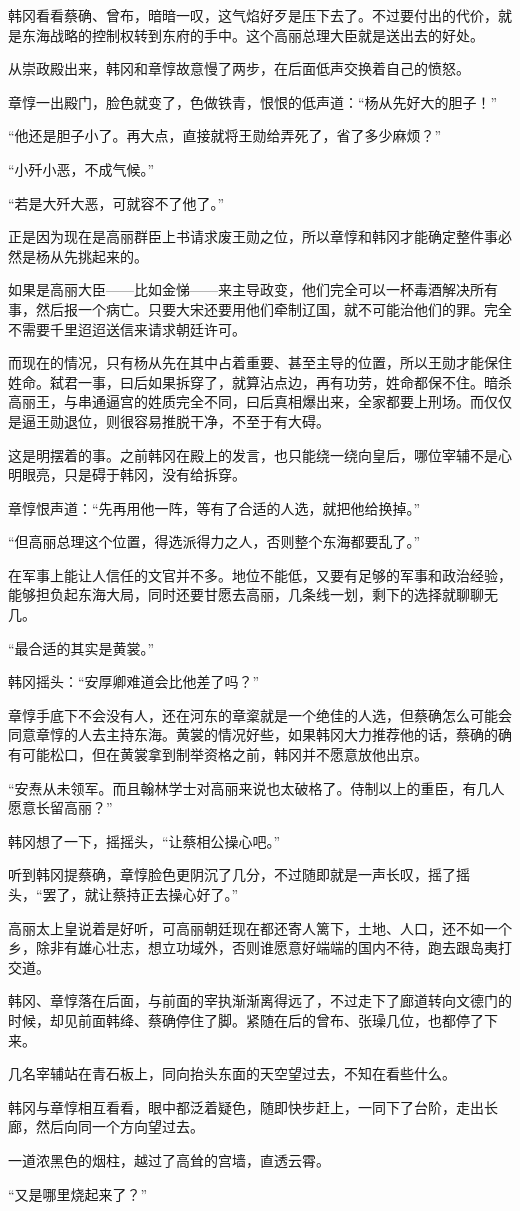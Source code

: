 韩冈看看蔡确、曾布，暗暗一叹，这气焰好歹是压下去了。不过要付出的代价，就是东海战略的控制权转到东府的手中。这个高丽总理大臣就是送出去的好处。

从崇政殿出来，韩冈和章惇故意慢了两步，在后面低声交换着自己的愤怒。

章惇一出殿门，脸色就变了，色做铁青，恨恨的低声道：“杨从先好大的胆子！”

“他还是胆子小了。再大点，直接就将王勋给弄死了，省了多少麻烦？”

“小歼小恶，不成气候。”

“若是大歼大恶，可就容不了他了。”

正是因为现在是高丽群臣上书请求废王勋之位，所以章惇和韩冈才能确定整件事必然是杨从先挑起来的。

如果是高丽大臣——比如金悌——来主导政变，他们完全可以一杯毒酒解决所有事，然后报一个病亡。只要大宋还要用他们牵制辽国，就不可能治他们的罪。完全不需要千里迢迢送信来请求朝廷许可。

而现在的情况，只有杨从先在其中占着重要、甚至主导的位置，所以王勋才能保住姓命。弑君一事，曰后如果拆穿了，就算沾点边，再有功劳，姓命都保不住。暗杀高丽王，与串通逼宫的姓质完全不同，曰后真相爆出来，全家都要上刑场。而仅仅是逼王勋退位，则很容易推脱干净，不至于有大碍。

这是明摆着的事。之前韩冈在殿上的发言，也只能绕一绕向皇后，哪位宰辅不是心明眼亮，只是碍于韩冈，没有给拆穿。

章惇恨声道：“先再用他一阵，等有了合适的人选，就把他给换掉。”

“但高丽总理这个位置，得选派得力之人，否则整个东海都要乱了。”

在军事上能让人信任的文官并不多。地位不能低，又要有足够的军事和政治经验，能够担负起东海大局，同时还要甘愿去高丽，几条线一划，剩下的选择就聊聊无几。

“最合适的其实是黄裳。”

韩冈摇头：“安厚卿难道会比他差了吗？”

章惇手底下不会没有人，还在河东的章楶就是一个绝佳的人选，但蔡确怎么可能会同意章惇的人去主持东海。黄裳的情况好些，如果韩冈大力推荐他的话，蔡确的确有可能松口，但在黄裳拿到制举资格之前，韩冈并不愿意放他出京。

“安焘从未领军。而且翰林学士对高丽来说也太破格了。侍制以上的重臣，有几人愿意长留高丽？”

韩冈想了一下，摇摇头，“让蔡相公操心吧。”

听到韩冈提蔡确，章惇脸色更阴沉了几分，不过随即就是一声长叹，摇了摇头，“罢了，就让蔡持正去操心好了。”

高丽太上皇说着是好听，可高丽朝廷现在都还寄人篱下，土地、人口，还不如一个乡，除非有雄心壮志，想立功域外，否则谁愿意好端端的国内不待，跑去跟岛夷打交道。

韩冈、章惇落在后面，与前面的宰执渐渐离得远了，不过走下了廊道转向文德门的时候，却见前面韩绛、蔡确停住了脚。紧随在后的曾布、张璪几位，也都停了下来。

几名宰辅站在青石板上，同向抬头东面的天空望过去，不知在看些什么。

韩冈与章惇相互看看，眼中都泛着疑色，随即快步赶上，一同下了台阶，走出长廊，然后向同一个方向望过去。

一道浓黑色的烟柱，越过了高耸的宫墙，直透云霄。

“又是哪里烧起来了？”

